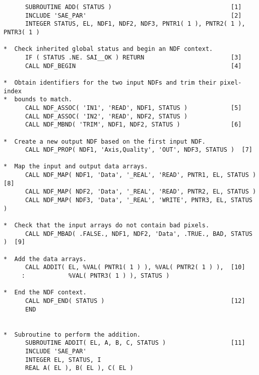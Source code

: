 \small
\begin{verbatim}
      SUBROUTINE ADD( STATUS )                                 [1]
      INCLUDE 'SAE_PAR'                                        [2]
      INTEGER STATUS, EL, NDF1, NDF2, NDF3, PNTR1( 1 ), PNTR2( 1 ), PNTR3( 1 )
                                                              
*  Check inherited global status and begin an NDF context.    
      IF ( STATUS .NE. SAI__OK ) RETURN                        [3]
      CALL NDF_BEGIN                                           [4]
                                                              
*  Obtain identifiers for the two input NDFs and trim their pixel-index
*  bounds to match.                                           
      CALL NDF_ASSOC( 'IN1', 'READ', NDF1, STATUS )            [5]
      CALL NDF_ASSOC( 'IN2', 'READ', NDF2, STATUS )           
      CALL NDF_MBND( 'TRIM', NDF1, NDF2, STATUS )              [6]
                                                              
*  Create a new output NDF based on the first input NDF.      
      CALL NDF_PROP( NDF1, 'Axis,Quality', 'OUT', NDF3, STATUS )  [7]
                                                              
*  Map the input and output data arrays.                      
      CALL NDF_MAP( NDF1, 'Data', '_REAL', 'READ', PNTR1, EL, STATUS )  [8]
      CALL NDF_MAP( NDF2, 'Data', '_REAL', 'READ', PNTR2, EL, STATUS )
      CALL NDF_MAP( NDF3, 'Data', '_REAL', 'WRITE', PNTR3, EL, STATUS )
                                                              
*  Check that the input arrays do not contain bad pixels.     
      CALL NDF_MBAD( .FALSE., NDF1, NDF2, 'Data', .TRUE., BAD, STATUS )  [9]
                                                              
*  Add the data arrays.                                       
      CALL ADDIT( EL, %VAL( PNTR1( 1 ) ), %VAL( PNTR2( 1 ) ),  [10]
     :            %VAL( PNTR3( 1 ) ), STATUS )                
                                                              
*  End the NDF context.                                       
      CALL NDF_END( STATUS )                                   [12]
      END                                                     
                                                              
                                                              
*  Subroutine to perform the addition.                        
      SUBROUTINE ADDIT( EL, A, B, C, STATUS )                  [11]
      INCLUDE 'SAE_PAR'                                       
      INTEGER EL, STATUS, I                                   
      REAL A( EL ), B( EL ), C( EL )                          
                                                              

\end{verbatim}
